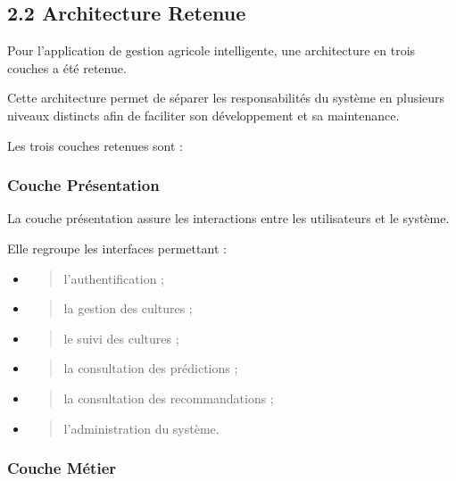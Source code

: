 \documentclass[
]{article}
\begin{document}
\hypertarget{architecture-retenue}{%
\subsection{2.2 Architecture Retenue}\label{architecture-retenue}}

Pour l'application de gestion agricole intelligente, une architecture en
trois couches a été retenue.

Cette architecture permet de séparer les responsabilités du système en
plusieurs niveaux distincts afin de faciliter son développement et sa
maintenance.

Les trois couches retenues sont :

\hypertarget{couche-pruxe9sentation}{%
\subsubsection{Couche Présentation}\label{couche-pruxe9sentation}}

La couche présentation assure les interactions entre les utilisateurs et
le système.

Elle regroupe les interfaces permettant :

\begin{itemize}
\item
  \begin{quote}
  l'authentification ;
  \end{quote}
\item
  \begin{quote}
  la gestion des cultures ;
  \end{quote}
\item
  \begin{quote}
  le suivi des cultures ;
  \end{quote}
\item
  \begin{quote}
  la consultation des prédictions ;
  \end{quote}
\item
  \begin{quote}
  la consultation des recommandations ;
  \end{quote}
\item
  \begin{quote}
  l'administration du système.
  \end{quote}
\end{itemize}

\hypertarget{couche-muxe9tier}{%
\subsubsection{Couche Métier}\label{couche-muxe9tier}}
\end{document}
